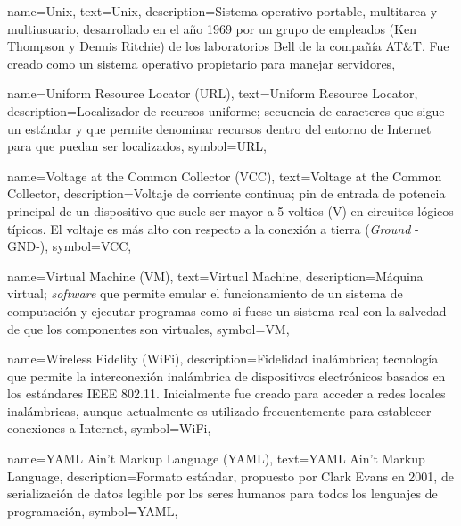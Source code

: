 {
    name={Unix},
    text={Unix},
    description={Sistema operativo portable, multitarea y multiusuario, desarrollado en el año 1969 por un grupo de empleados (Ken Thompson y Dennis Ritchie) de los laboratorios Bell de la compañía AT\&T. Fue creado como un sistema operativo propietario para manejar servidores},
}

{
    name={Uniform Resource Locator (URL)},
    text={Uniform Resource Locator},
    description={Localizador de recursos uniforme; secuencia de caracteres que sigue un estándar y que permite denominar recursos dentro del entorno de Internet para que puedan ser localizados},
    symbol={URL},
}

{
    name={Voltage at the Common Collector (VCC)},
    text={Voltage at the Common Collector},
    description={Voltaje de corriente continua; pin de entrada de potencia principal de un dispositivo que suele ser mayor a 5 voltios (V) en circuitos lógicos típicos. El voltaje es más alto con respecto a la conexión a tierra (\textit{Ground} -GND-)},
    symbol={VCC},
}

{
    name={Virtual Machine (VM)},
    text={Virtual Machine},
    description={Máquina virtual; \textit{software} que permite emular el funcionamiento de un sistema de computación y ejecutar programas como si fuese un sistema real con la salvedad de que los componentes son virtuales},
    symbol={VM},
}
	
{
    name={Wireless Fidelity (WiFi)},
    description={Fidelidad inalámbrica; tecnología que permite la interconexión inalámbrica de dispositivos electrónicos basados en los estándares IEEE 802.11. Inicialmente fue creado para acceder a redes locales inalámbricas, aunque actualmente es utilizado frecuentemente para establecer conexiones a Internet},
    symbol={WiFi},
}

{
    name={YAML Ain't Markup Language (YAML)},
    text={YAML Ain't Markup Language},
    description={Formato estándar, propuesto por Clark Evans en 2001, de serialización de datos legible por los seres humanos para todos los lenguajes de programación},
    symbol={YAML},
}

